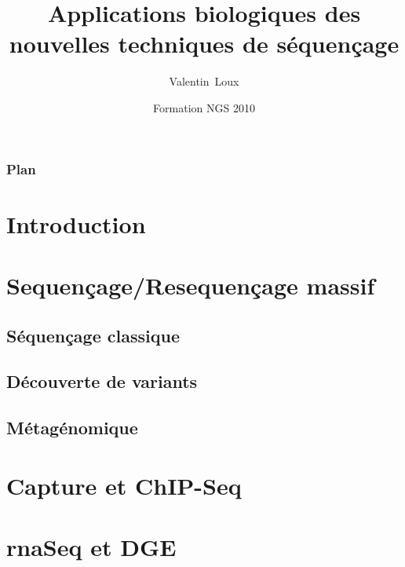 \documentclass{beamer}
\title[Applications NGS] %
{Applications biologiques des nouvelles techniques de séquençage}
\author[V. Loux] %
{Valentin~Loux}
\institute[INRA-MIG] %
{
  Unité Mathématique, Informatique et Génome\\
  INRA, Jouy en Josas
}
\date[2 Novembre 2010] %
{Formation NGS 2010}
\begin{document}
\begin{frame}
  \titlepage
\end{frame}

\begin{frame}
  \frametitle{Plan}
  \tableofcontents
\end{frame}


\section{Introduction}

\section{Sequençage/Resequençage massif} %
\label{sec:sequençage_resequençage_massif}


\subsection{Séquençage classique} %
\label{sub:séquençage_classique_}


\subsection{Découverte de variants} %
\label{sub:decouverte_de_variants}


\subsection{Métagénomique} %
\label{sub:métagénomique}



\section{Capture et ChIP-Seq} %
\label{sec:capture_et_chip_seq}


\section{rnaSeq et DGE} %
\label{sec:rnaseq_dge}
\end{document}
